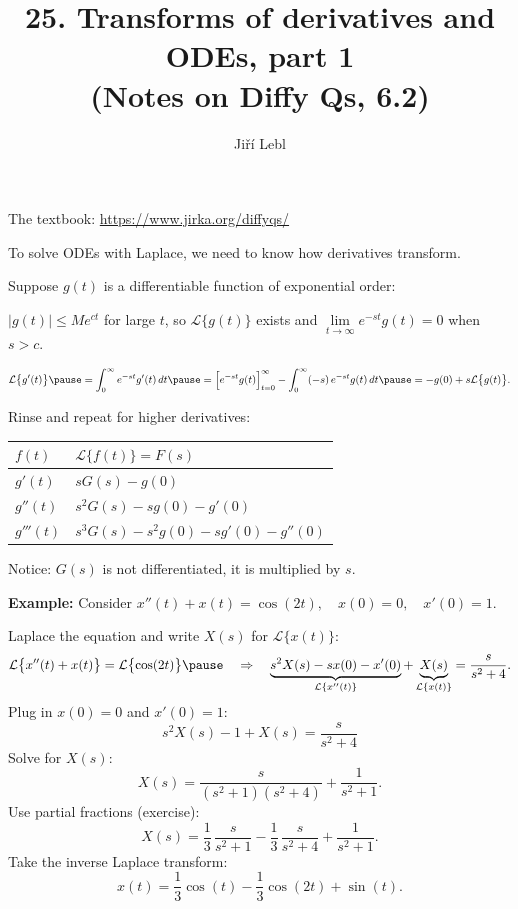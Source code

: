 \documentclass[10pt,aspectratio=169]{beamer}
\author{Ji\v{r}\'i Lebl}
\institute[OSU]{%
Oklahoma State University%
}
\title{25. Transforms of derivatives and ODEs, part 1\\(Notes on Diffy Qs, 6.2)}
\date{}
\begin{document}
\begin{frame}
\titlepage


\begin{center}
The textbook: \url{https://www.jirka.org/diffyqs/}
\end{center}
\end{frame}

\begin{frame}
To solve ODEs with Laplace, we need to know how derivatives transform.

\medskip
\pause

Suppose $g(t)$ is a differentiable function of exponential order:

\medskip
\pause

$\lvert g(t) \rvert \leq M e^{ct}$ for large $t$,
\qquad
so $\mathcal{L} \bigl\{ g(t) \bigr\}$ exists
\quad
and
\qquad
 $\lim\limits_{t\to\infty} e^{-st}g(t) = 0$ when $s > c$.

\pause
\[
\mathcal{L} \bigl\{ g'(t) \bigr\}
\pause
=
\int_0^\infty
e^{-st}
g'(t) \,dt
\pause
=
\Bigl[e^{-st} g(t) \Bigr]_{t=0}^\infty
-
\int_0^\infty
(-s)\,
e^{-st}
g(t) \,dt
\pause
=
-g(0) + s \mathcal{L} \bigl\{ g(t) \bigr\} .
\]
\pause

Rinse and repeat for higher derivatives:
\begin{center}
\begin{tabular}{@{}ll@{}}
\toprule
$f(t)$ & $\mathcal{L} \bigl\{ f(t) \bigr\} = F(s)$ \\
\midrule
$g'(t)$ & $sG(s)-g(0)$ \\[4pt]
$g''(t)$ & $s^2G(s)-sg(0)-g'(0)$ \\[4pt]
$g'''(t)$ & $s^3G(s)-s^2g(0)-sg'(0)-g''(0)$ \\[4pt]
\bottomrule
\end{tabular}
\end{center}
\pause
Notice: $G(s)$ is not differentiated, it is multiplied by $s$.

\end{frame}

\begin{frame}
\textbf{Example:}
Consider
\qquad
$x''(t) + x(t) = \cos (2t), \quad x(0) = 0, \quad x'(0) = 1$.

\medskip
\pause

Laplace the equation and write $X(s)$ for $\mathcal{L}\bigl\{x(t)\bigr\}$:
\[
\mathcal{L} \bigl\{ x''(t) + x(t) \bigr\}
= \mathcal{L} \bigl\{ \cos (2t) \bigr\}
\pause
\quad
\Rightarrow
\quad
\underbrace{s^2 X(s) -sx(0)-x'(0)}_{\mathcal{L}\{x''(t)\}}
+ \underbrace{X(s)}_{\mathcal{L}\{x(t)\}}
= \frac{s}{s^2 + 4} .
\]
\pause
Plug in $x(0)=0$ and $x'(0)=1$:
\[
s^2 X(s) -1 + X(s) = \dfrac{s}{s^2 + 4}
\]
\pause
Solve for $X(s)$:
\[
X(s) = \frac{s}{(s^2+1)(s^2 + 4)} + \frac{1}{s^2+1} .
\]
\pause
Use partial fractions (exercise):
\[
X(s) =\frac{1}{3} \, \frac{s}{s^2+1} - 
\frac{1}{3}\, \frac{s}{s^2+4} + \frac{1}{s^2+1} .
\]
\pause
Take the inverse Laplace transform:
\[
x(t) =\frac{1}{3}  \cos (t) -
\frac{1}{3} \cos (2t) + \sin (t) .
\]
\end{frame}
\end{document}
